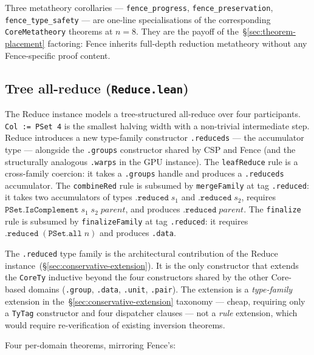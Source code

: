 \documentclass[acmsmall,screen,review,anonymous,nonacm]{acmart}
\newcommand{\TyTag}{\texttt{TyTag}}
\begin{document}
Three metatheory corollaries --- \texttt{fence\_progress}, \texttt{fence\_preservation}, \texttt{fence\_type\_safety} --- are one-line specialisations of the corresponding \texttt{CoreMetatheory} theorems at $n = 8$. They are the payoff of the~\S\ref{sec:theorem-placement} factoring: Fence inherits full-depth reduction metatheory without any Fence-specific proof content.

\subsection{Tree all-reduce (\texttt{Reduce.lean})}\label{sec:tree-all-reduce}

The Reduce instance models a tree-structured all-reduce over four participants. \texttt{Col := PSet 4} is the smallest halving width with a non-trivial intermediate step. Reduce introduces a new type-family constructor \texttt{.reduced\;s} --- the accumulator type --- alongside the \texttt{.group\;s} constructor shared by CSP and Fence (and the structurally analogous \texttt{.warp\;s} in the GPU instance). The \texttt{leafReduce} rule is a cross-family coercion: it takes a \texttt{.group\;s} handle and produces a \texttt{.reduced\;s} accumulator. The \texttt{combineRed} rule is subsumed by \texttt{mergeFamily} at tag \texttt{.reduced}: it takes two accumulators of types $\texttt{.reduced}\;s_1$ and $\texttt{.reduced}\;s_2$, requires $\texttt{PSet.IsComplement}\;s_1\;s_2\;\mathit{parent}$, and produces $\texttt{.reduced}\;\mathit{parent}$. The \texttt{finalize} rule is subsumed by \texttt{finalizeFamily} at tag \texttt{.reduced}: it requires $\texttt{.reduced}\;(\texttt{PSet.all}\;n)$ and produces \texttt{.data}.

The \texttt{.reduced} type family is the architectural contribution of the Reduce instance~(\S\ref{sec:conservative-extension}). It is the only constructor that extends the \texttt{CoreTy} inductive beyond the four constructors shared by the other Core-based domains (\texttt{.group}, \texttt{.data}, \texttt{.unit}, \texttt{.pair}). The extension is a \emph{type-family} extension in the~\S\ref{sec:conservative-extension} taxonomy --- cheap, requiring only a \TyTag{} constructor and four dispatcher clauses --- not a \emph{rule} extension, which would require re-verification of existing inversion theorems.

Four per-domain theorems, mirroring Fence's:
\end{document}

